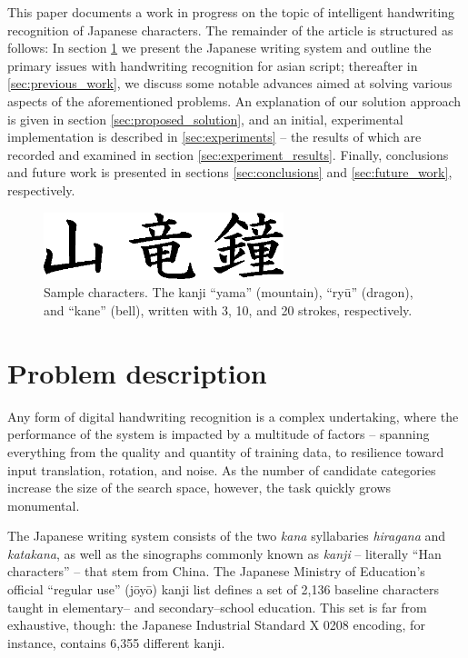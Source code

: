 \documentclass[10pt,conference,a4paper]{IEEEtran}
\begin{document}
	This paper documents a work in progress on the topic of intelligent handwriting recognition of Japanese characters.
	The remainder of the article is structured as follows:
	In section \ref{sec:problem_description} we present the Japanese writing system and outline the primary issues with handwriting recognition for asian script;
	thereafter in \ref{sec:previous_work}, we discuss some notable advances aimed at solving various aspects of the aforementioned problems.
	An explanation of our solution approach is given in section \ref{sec:proposed_solution}, and an initial, experimental implementation is described in \ref{sec:experiments}
	-- the results of which are recorded and examined in section \ref{sec:experiment_results}. Finally, conclusions and future work is presented in sections
	\ref{sec:conclusions} and \ref{sec:future_work}, respectively.

	
	\begin{figure}
		\centering
		\includegraphics[width=2.75in]{./fig/yama-ryuu-kane.eps}
		\caption{Sample characters. The kanji ``yama'' (mountain), ``ry\=u'' (dragon), and ``kane'' (bell), written with 3, 10, and 20 strokes, respectively.}
		\label{fig_kanji_sample}
	\end{figure}

	\vfill


	\section{Problem description}
	\label{sec:problem_description}

	Any form of digital handwriting recognition is a complex undertaking,
	where the performance of the system is impacted by a multitude of factors -- spanning
	everything from the quality and quantity of training data, to resilience toward input
	translation, rotation, and noise. As the number of candidate categories increase
	the size of the search space, however, the task quickly grows monumental.

	The Japanese writing system consists of the two \emph{kana} syllabaries \emph{hiragana} and \emph{katakana},
	as well as the sinographs commonly known as \emph{kanji} -- literally ``Han characters'' -- that stem from China.
	The Japanese Ministry of Education's official ``regular use'' (j\=oy\=o) kanji list defines a set of 2,136
	baseline characters taught in elementary-- and secondary--school education. \cite{hadamitzky2012japanese}
	This set is far from exhaustive, though: the Japanese Industrial Standard X 0208 encoding, for instance, contains 6,355 different kanji.
\end{document}
